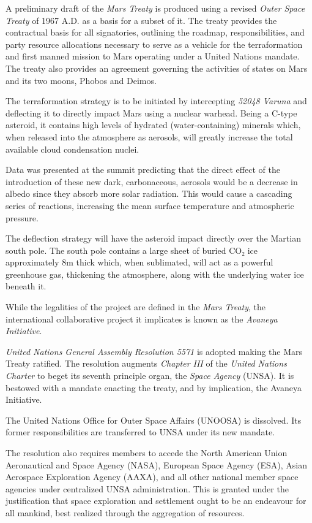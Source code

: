 A preliminary draft of the {\it Mars Treaty} is produced using a revised {\it Outer Space Treaty} of 1967 A.D. as a basis for a subset of it. The treaty provides the contractual basis for all signatories, outlining the roadmap, responsibilities, and party resource allocations necessary to serve as a vehicle for the terraformation and first manned mission to Mars operating under a United Nations mandate. The treaty also provides an agreement governing the activities of states on Mars and its two moons, Phobos and Deimos.

The terraformation strategy is to be initiated by intercepting {\it 52048 Varuna} and deflecting it to directly impact Mars using a nuclear warhead. Being a C-type asteroid, it contains high levels of hydrated (water-containing) minerals which, when released into the atmosphere as aerosols, will greatly increase the total available cloud condensation nuclei. 

Data was presented at the summit predicting that the direct effect of the introduction of these new dark, carbonaceous, aerosols would be a decrease in albedo since they absorb more solar radiation. This would cause a cascading series of reactions, increasing the mean surface temperature and atmospheric pressure.

The deflection strategy will have the asteroid impact directly over the Martian south pole. The south pole contains a large sheet of buried CO₂ ice approximately 8m thick which, when sublimated, will act as a powerful greenhouse gas, thickening the atmosphere, along with the underlying water ice beneath it.

While the legalities of the project are defined in the {\it Mars Treaty}, the international collaborative project it implicates is known as the {\it Avaneya Initiative}.
\StopTimelineDate

{\it United Nations General Assembly Resolution 5571} is adopted making the Mars Treaty ratified. The resolution augments {\it Chapter III} of the {\it United Nations Charter} to beget its seventh principle organ, the {\it Space Agency} (UNSA). It is bestowed with a mandate enacting the treaty, and by implication, the Avaneya Initiative.

The United Nations Office for Outer Space Affairs (UNOOSA) is dissolved. Its former responsibilities are transferred to UNSA under its new mandate.

The resolution also requires members to accede the North American Union Aeronautical and Space Agency (NASA), European Space Agency (ESA), Asian Aerospace Exploration Agency (AAXA), and all other national member space agencies under centralized UNSA administration. This is granted under the justification that space exploration and settlement ought to be an endeavour for all mankind, best realized through the aggregation of resources.

